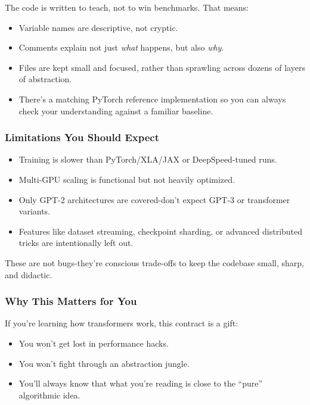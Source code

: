 \documentclass[
  letterpaper,
  DIV=11,
  numbers=noendperiod]{scrreprt}
\providecommand{\tightlist}{%
  \setlength{\itemsep}{0pt}\setlength{\parskip}{0pt}}
\begin{document}
The code is written to teach, not to win benchmarks. That means:

\begin{itemize}
\tightlist
\item
  Variable names are descriptive, not cryptic.
\item
  Comments explain not just \emph{what} happens, but also \emph{why}.
\item
  Files are kept small and focused, rather than sprawling across dozens
  of layers of abstraction.
\item
  There's a matching PyTorch reference implementation so you can always
  check your understanding against a familiar baseline.
\end{itemize}

\subsubsection{Limitations You Should
Expect}\label{limitations-you-should-expect}

\begin{itemize}
\tightlist
\item
  Training is slower than PyTorch/XLA/JAX or DeepSpeed-tuned runs.
\item
  Multi-GPU scaling is functional but not heavily optimized.
\item
  Only GPT-2 architectures are covered-don't expect GPT-3 or transformer
  variants.
\item
  Features like dataset streaming, checkpoint sharding, or advanced
  distributed tricks are intentionally left out.
\end{itemize}

These are not bugs-they're conscious trade-offs to keep the codebase
small, sharp, and didactic.

\subsubsection{Why This Matters for You}\label{why-this-matters-for-you}

If you're learning how transformers work, this contract is a gift:

\begin{itemize}
\tightlist
\item
  You won't get lost in performance hacks.
\item
  You won't fight through an abstraction jungle.
\item
  You'll always know that what you're reading is close to the ``pure''
  algorithmic idea.
\end{itemize}
\end{document}
